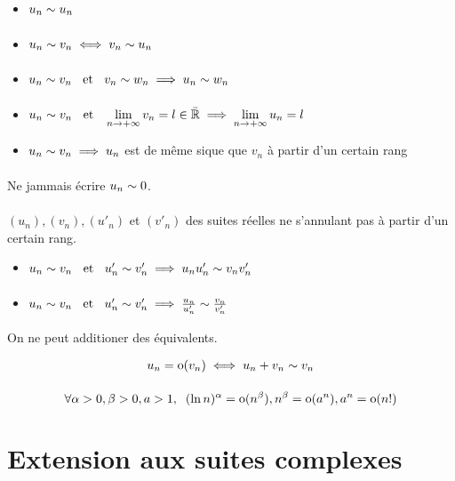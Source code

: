 \begin{prp}
\begin{itemize}
    \item $u_n \underset{}{\sim} u_n$
    \item $u_n \underset{}{\sim} v_n \iff v_n \underset{}{\sim} u_n$
    \item $u_n \underset{}{\sim} v_n \;\;\text{ et }\;\; v_n \underset{}{\sim} w_n \implies u_n \underset{}{\sim} w_n$
    \item $u_n \underset{}{\sim} v_n \;\;\text{ et }\;\; \lim\limits_{n \to +\infty} v_n = l \in \bar{\mathbb{R}} \implies
    \lim\limits_{n \to +\infty} u_n = l$
    \item $u_n \underset{}{\sim} v_n \implies u_n$ est de même sique que $v_n$ à partir
    d'un certain rang
\end{itemize}
\end{prp}

\begin{rem}
\begin{att}
Ne jammais écrire $u_n \underset{}{\sim} 0$.
\end{att}
\end{rem}

\begin{prp}
$(u_n), (v_n), (u'_n)$ et $(v'_n)$ des suites réelles ne s'annulant pas
à partir d'un certain rang.
\begin{itemize}
    \item $u_n \underset{}{\sim} v_n \;\;\text{ et }\;\; u'_n \underset{}{\sim} v'_n \implies u_n u'_n \underset{}{\sim} v_n v'_n$
    \item $u_n \underset{}{\sim} v_n \;\;\text{ et }\;\; u'_n \underset{}{\sim} v'_n \implies 
    \frac{u_n}{u'_n} \underset{}{\sim} \frac{v_n}{v'_n}$
\end{itemize}
\end{prp}

\begin{rem}
\begin{att}
On ne peut additioner des équivalents.
\end{att}
\end{rem}

\begin{prp}
\[
    u_n = \operatorname*{o}(v_n) \iff u_n + v_n \underset{}{\sim} v_n
\]
\end{prp}

\begin{prp}
\[
    \forall \alpha > 0, \beta > 0, a > 1, \;\; 
    (\ln n)^\alpha = \operatorname*{o}(n^\beta), n^\beta = \operatorname*{o}(a^n), a^n = \operatorname*{o}(n!)
\]
\end{prp}


\section{Extension aux suites complexes}

